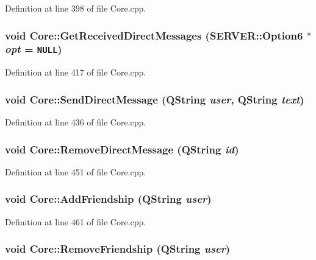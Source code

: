 Definition at line 398 of file Core.cpp.\hypertarget{classCore_5496ee42ce9d32aa0f98a2d56e3bbddf}{
\subsubsection{\setlength{\rightskip}{0pt plus 5cm}void Core::GetReceivedDirectMessages ({\bf SERVER::Option6} $\ast$ {\em opt} = {\tt NULL})}}
\label{classCore_5496ee42ce9d32aa0f98a2d56e3bbddf}




Definition at line 417 of file Core.cpp.\hypertarget{classCore_f6afb71b9114a90e9b9856f64a6fe9cf}{
\subsubsection{\setlength{\rightskip}{0pt plus 5cm}void Core::SendDirectMessage (QString {\em user}, \/  QString {\em text})}}
\label{classCore_f6afb71b9114a90e9b9856f64a6fe9cf}




Definition at line 436 of file Core.cpp.\hypertarget{classCore_d98d496c44ebff775698737f8edbde44}{
\subsubsection{\setlength{\rightskip}{0pt plus 5cm}void Core::RemoveDirectMessage (QString {\em id})}}
\label{classCore_d98d496c44ebff775698737f8edbde44}




Definition at line 451 of file Core.cpp.\hypertarget{classCore_3df3b62fa5366492a3eb4bba99f1849a}{
\subsubsection{\setlength{\rightskip}{0pt plus 5cm}void Core::AddFriendship (QString {\em user})}}
\label{classCore_3df3b62fa5366492a3eb4bba99f1849a}




Definition at line 461 of file Core.cpp.\hypertarget{classCore_95ce85046d01f3d5d6928f06e8aab99c}{
\subsubsection{\setlength{\rightskip}{0pt plus 5cm}void Core::RemoveFriendship (QString {\em user})}}
\label{classCore_95ce85046d01f3d5d6928f06e8aab99c}




